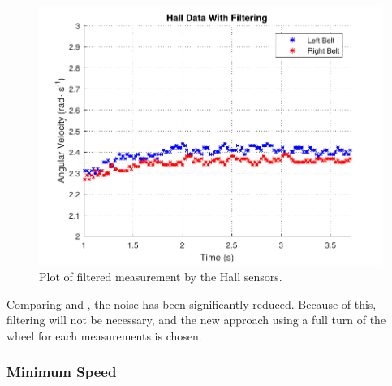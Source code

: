 \begin{figure}[H]
	\centering
	\includegraphics[scale=0.9]{figures/filteredHall.pdf}
	\caption{Plot of filtered measurement by the Hall sensors.}
	\label{filteredHall}
\end{figure}

Comparing  and , the noise has been significantly reduced.
Because of this, filtering will not be necessary, and the new approach using a full turn of the wheel for each measurements is chosen.




\subsubsection{Minimum Speed}

